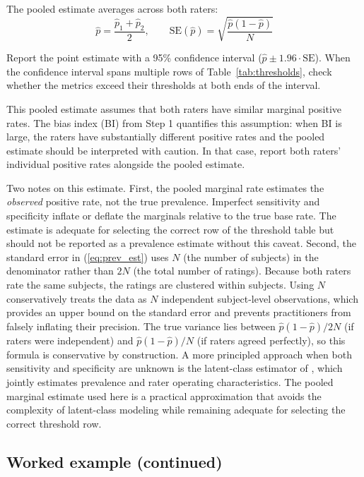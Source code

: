 \documentclass[11pt]{article}
\begin{document}
The pooled estimate averages across both raters:
\begin{equation}
\hat{p} = \frac{\hat{p}_1 + \hat{p}_2}{2}, \qquad \text{SE}(\hat{p}) = \sqrt{\frac{\hat{p}(1 - \hat{p})}{N}}
\label{eq:prev_est}
\end{equation}

Report the point estimate with a 95\% confidence interval ($\hat{p} \pm 1.96 \cdot \text{SE}$). When the confidence interval spans multiple rows of Table~\ref{tab:thresholds}, check whether the metrics exceed their thresholds at both ends of the interval.

This pooled estimate assumes that both raters have similar marginal positive rates. The bias index (BI) from Step 1 quantifies this assumption: when BI is large, the raters have substantially different positive rates and the pooled estimate should be interpreted with caution. In that case, report both raters' individual positive rates alongside the pooled estimate.

Two notes on this estimate. First, the pooled marginal rate estimates the \textit{observed} positive rate, not the true prevalence. Imperfect sensitivity and specificity inflate or deflate the marginals relative to the true base rate. The estimate is adequate for selecting the correct row of the threshold table but should not be reported as a prevalence estimate without this caveat. Second, the standard error in (\ref{eq:prev_est}) uses $N$ (the number of subjects) in the denominator rather than $2N$ (the total number of ratings). Because both raters rate the same subjects, the ratings are clustered within subjects. Using $N$ conservatively treats the data as $N$ independent subject-level observations, which provides an upper bound on the standard error and prevents practitioners from falsely inflating their precision. The true variance lies between $\hat{p}(1-\hat{p})/2N$ (if raters were independent) and $\hat{p}(1-\hat{p})/N$ (if raters agreed perfectly), so this formula is conservative by construction. A more principled approach when both sensitivity and specificity are unknown is the latent-class estimator of \citet{hui1980estimating}, which jointly estimates prevalence and rater operating characteristics. The pooled marginal estimate used here is a practical approximation that avoids the complexity of latent-class modeling while remaining adequate for selecting the correct threshold row.

\subsection*{Worked example (continued)}
\end{document}
